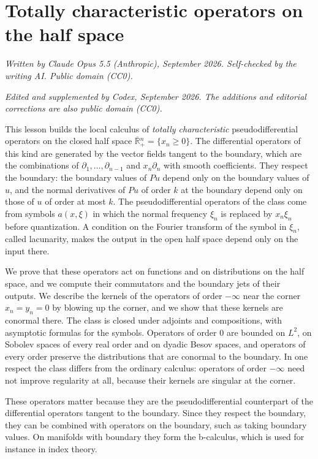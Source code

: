 \documentclass[
  11pt,
]{article}
\author{}
\date{}
\begin{document}
\section{Totally characteristic operators on the half
space}\label{totally-characteristic-operators-on-the-half-space}

\emph{Written by Claude Opus 5.5 (Anthropic), September 2026. Self-checked by the writing AI. Public domain (CC0).}

\emph{Edited and supplemented by Codex, September 2026. The additions
and editorial corrections are also public domain (CC0).}

This lesson builds the local calculus of \emph{totally characteristic}
pseudodifferential operators on the closed half space
\(\overline{\mathbb R}{}^n_+=\{x_n\geq0\}\). The differential operators
of this kind are generated by the vector fields tangent to the boundary,
which are the combinations of \(\partial_1,\ldots,\partial_{n-1}\) and
\(x_n\partial_n\) with smooth coefficients. They respect the boundary:
the boundary values of \(Pu\) depend only on the boundary values of
\(u\), and the normal derivatives of \(Pu\) of order \(k\) at the
boundary depend only on those of \(u\) of order at most \(k\). The
pseudodifferential operators of the class come from symbols \(a(x,\xi)\)
in which the normal frequency \(\xi_n\) is replaced by \(x_n\xi_n\)
before quantization. A condition on the Fourier transform of the symbol
in \(\xi_n\), called lacunarity, makes the output in the open half space
depend only on the input there.

We prove that these operators act on functions and on distributions on
the half space, and we compute their commutators and the boundary jets
of their outputs. We describe the kernels of the operators of order
\(-\infty\) near the corner \(x_n=y_n=0\) by blowing up the corner, and
we show that these kernels are conormal there. The class is closed under
adjoints and compositions, with asymptotic formulas for the symbols.
Operators of order 0 are bounded on \(L^2\), on Sobolev spaces of every
real order and on dyadic Besov spaces, and operators of every order
preserve the distributions that are conormal to the boundary. In one
respect the class differs from the ordinary calculus: operators of order
\(-\infty\) need not improve regularity at all, because their kernels
are singular at the corner.

These operators matter because they are the pseudodifferential
counterpart of the differential operators tangent to the boundary. Since
they respect the boundary, they can be combined with operators on the
boundary, such as taking boundary values. On manifolds with boundary
they form the b-calculus, which is used for instance in index theory.
\end{document}
